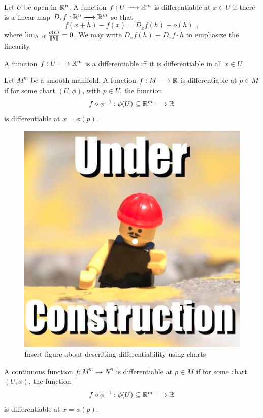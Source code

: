 \begin{definition}
	Let $U$ be open in $\mathbb R^n$. A function $f:U\to\bbR^m$ is differentiable at $x\in U$ if there is a linear map $D_x f : \bbR^n\to\bbR^m$ so that
	$$ f(x + h) - f(x) = D_x f(h) + o(h) ~~,$$
	where $\lim_{h\sto0} \frac{o(h)}{\norm{h}} = 0$. We may write  $D_x f(h)\equiv D_x f \cdot h$ to emphasize the linearity.
	
	A function $f:U\to\bbR^m$ is a differentiable iff it is differentiable in all $x\in U$.
\end{definition}

\begin{definition}
	Let $M^m$ be a smooth manifold.
	A function $f:M\to\bbR$ is differentiable at $p\in M$ if for some chart $(U,\phi)$, with $p\in U$, the function
	$$ f \circ\phi^{-1} : \phi(U) \subseteq \bbR^m \to \bbR$$
	is differentiable at $x=\phi(p)$.
\end{definition}

\begin{figure}[H]
	\centering
	\includegraphics[scale=0.20]{Figures/underconstruction.jpg}
	\caption{\color{red} Insert figure about describing differentiability using charts}
\end{figure}

\begin{definition}
	A continuous function $f:M^m\to N^n$ is differentiable at $p\in M$ if for some chart $(U,\phi)$, the function
	$$ f \circ\phi^{-1} : \phi(U) \subseteq \bbR^m \to \bbR$$
	is differentiable at $x=\phi(p)$.
\end{definition}

